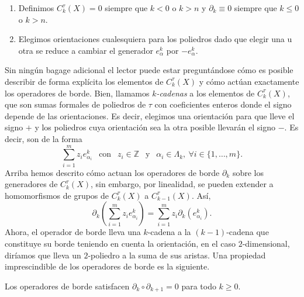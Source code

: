 \begin{remark}\hfill
    \begin{enumerate}[label=(\roman*)]
        \item Definimos $C^{\tau}_k(X) = 0$ siempre que $k<0$ o $k>n$ y $\partial_k \equiv 0$ siempre que $k\le 0$ o $k>n$.
        \item Elegimos orientaciones cualesquiera para los poliedros dado que elegir una u otra se reduce a cambiar el generador $e^k_{\alpha}$ por $-e^k_{\alpha}$.
    \end{enumerate}
\end{remark}

\bigskip

Sin ningún bagage adicional el lector puede estar preguntándose cómo es posible describir de forma explícita los elementos de $C^{\tau}_k(X)$ y cómo actúan exactamente los operadores de borde. Bien, llamamos \textit{$k$-cadenas} a los elementos de $C^{\tau}_k(X)$, que son sumas formales de poliedros de $\tau$ con coeficientes enteros donde el signo depende de las orientaciones. Es decir, elegimos una orientación para que lleve el signo $+$ y los poliedros cuya orientación sea la otra posible llevarán el signo $-$. Es decir, son de la forma
\begin{equation*}
    \sum_{i=1}^m z_i e^k_{\alpha_i} ~~\text{ con }~~ z_i \in \mathbb{Z} ~~\text{ y }~~ \alpha_i \in \Lambda_k, ~\forall i\in \{1,\dots, m\}.
\end{equation*}
Arriba hemos descrito cómo actuan los operadores de borde $\partial_k$ sobre los generadores de $C^{\tau}_k(X)$, sin embargo, por linealidad, se pueden extender a homomorfismos de grupos de $C^{\tau}_k(X)$ a $C^{\tau}_{k-1}(X)$. Así,
\begin{equation*}
    \partial_k \left( \sum_{i=1}^m z_i e^k_{\alpha_i} \right) = \sum_{i=1}^m z_i \partial_k (e^k_{\alpha_i}). 
\end{equation*}
Ahora, el operador de borde lleva una $k$-cadena a la $(k-1)$-cadena que constituye su borde teniendo en cuenta la orientación, en el caso $2$-dimensional, diríamos que lleva un $2$-poliedro a la suma de sus aristas. Una propiedad imprescindible de los operadores de borde es la siguiente.

\begin{proposition}
\label{prop_bordes}
    Los operadores de borde satisfacen $\partial_{k}\circ\partial_{k+1}=0$ para todo $k\ge 0$.
\end{proposition}

